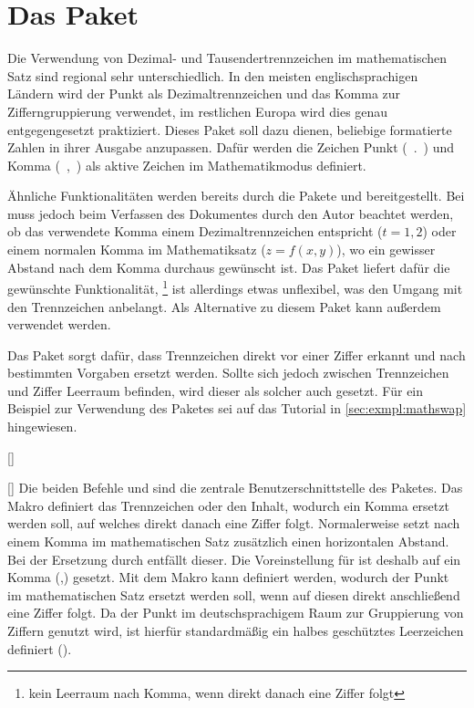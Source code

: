 \section{Das Paket }
%
%
%
\begin{Bundle*}{}
Die Verwendung von Dezimal- und Tausendertrennzeichen im mathematischen Satz 
sind regional sehr unterschiedlich. In den meisten englischsprachigen Ländern 
wird der Punkt als Dezimaltrennzeichen und das Komma zur Zifferngruppierung 
verwendet, im restlichen Europa wird dies genau entgegengesetzt praktiziert.
Dieses Paket soll dazu dienen, beliebige formatierte Zahlen in ihrer Ausgabe 
anzupassen. Dafür werden die Zeichen Punkt (\ .\ ) und Komma (\ ,\ ) als 
aktive Zeichen im Mathematikmodus definiert.

Ähnliche Funktionalitäten werden bereits durch die Pakete  und 
 bereitgestellt. Bei  muss jedoch beim
Verfassen des Dokumentes durch den Autor beachtet werden, ob das verwendete
Komma einem Dezimaltrennzeichen entspricht ($t=1,\!2$) oder einem normalen 
Komma im Mathematiksatz ($z=f(x,y)$), wo ein gewisser Abstand nach dem Komma 
durchaus gewünscht ist. Das Paket  liefert dafür die gewünschte 
Funktionalität,%
\footnote{kein Leerraum nach Komma, wenn direkt danach eine Ziffer folgt}
ist allerdings etwas unflexibel, was den Umgang mit den Trennzeichen anbelangt.
Als Alternative zu diesem Paket kann außerdem  verwendet 
werden.

Das Paket  sorgt dafür, dass Trennzeichen direkt vor einer 
Ziffer erkannt und nach bestimmten Vorgaben ersetzt werden. Sollte sich jedoch 
zwischen Trennzeichen und Ziffer Leerraum befinden, wird dieser als solcher
auch gesetzt. Für ein Beispiel zur Verwendung des Paketes sei auf das Tutorial 
 in \autoref{sec:exmpl:mathswap} hingewiesen.

\begin{Declaration}{[]}
\begin{Declaration}{[]}
\printdeclarationlist%
%
Die beiden Befehle  und  sind die zentrale 
Benutzerschnittstelle des Paketes. Das Makro  definiert das 
Trennzeichen oder den Inhalt, wodurch ein Komma ersetzt werden soll, auf 
welches direkt danach eine Ziffer folgt. Normalerweise setzt 
nach einem Komma im mathematischen Satz zusätzlich einen horizontalen Abstand.
Bei der Ersetzung durch  entfällt dieser. Die Voreinstellung
für  ist deshalb auf ein Komma (,) gesetzt. Mit dem Makro 
 kann definiert werden, wodurch der Punkt im mathematischen 
Satz ersetzt werden soll, wenn auf diesen direkt anschließend eine Ziffer 
folgt. Da der Punkt im deutschsprachigem Raum zur Gruppierung von Ziffern 
genutzt wird, ist hierfür standardmäßig ein halbes geschütztes Leerzeichen 
definiert (\Macro*{,}).
\end{Declaration}
\end{Declaration}


\end{Bundle*}
